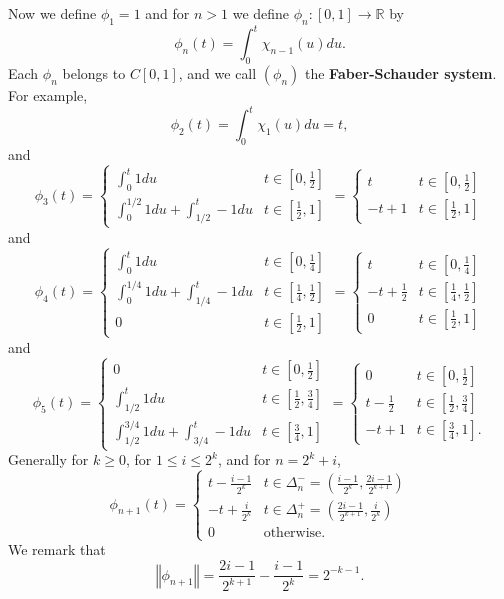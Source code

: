 \documentclass{article}
\newcommand{\norm}[1]{\left\Vert #1 \right\Vert}
\theoremstyle{definition}
\theoremstyle{definition}
\begin{document}
Now we define $\phi_1=1$ and for $n>1$ we define $\phi_n:[0,1] \to \mathbb{R}$ by
\[
\phi_n(t) = \int_0^t \chi_{n-1}(u) du.
\]
Each $\phi_n$ belongs to $C[0,1]$, and we call $(\phi_n)$ the \textbf{Faber-Schauder system}. 
For example,
\[
\phi_2(t) = \int_0^t \chi_1(u) du = t,
\]
 and
\[
 \phi_3(t) = \begin{cases}
\int_0^t 1du&t \in \left[0,\frac{1}{2}\right]\\
 \int_0^{1/2} 1du + \int_{1/2}^t -1 du&t \in \left[\frac{1}{2},1\right]
 \end{cases}
 =\begin{cases}
t &t \in \left[0,\frac{1}{2}\right]\\
-t+1 &t \in \left[\frac{1}{2},1\right]
 \end{cases}
\]
and
\[
 \phi_4(t) = \begin{cases}
\int_0^t 1du&t \in \left[0,\frac{1}{4}\right]\\
 \int_0^{1/4} 1du + \int_{1/4}^t -1 du&t \in \left[\frac{1}{4},\frac{1}{2} \right]\\
 0&t \in \left[\frac{1}{2},1\right]
 \end{cases}
 =\begin{cases}
t &t \in \left[0,\frac{1}{4}\right]\\
-t+\frac{1}{2} &t \in \left[\frac{1}{4},\frac{1}{2} \right]\\
 0&t \in \left[\frac{1}{2},1\right]
 \end{cases}
\]
and
\[
 \phi_5(t) = \begin{cases}
 0&t \in \left[0,\frac{1}{2}\right]\\
\int_{1/2}^t 1du&t \in \left[\frac{1}{2},\frac{3}{4}\right]\\
 \int_{1/2}^{3/4} 1du + \int_{3/4}^t -1 du&t \in \left[\frac{3}{4},1 \right]
  \end{cases}
 =\begin{cases}
  0&t \in \left[0,\frac{1}{2}\right]\\
t -\frac{1}{2}&t \in\left[\frac{1}{2},\frac{3}{4}\right]\\
-t+1 &t \in \left[\frac{3}{4},1 \right].
 \end{cases}
\]
Generally  for $k \geq 0$, for $1 \leq i \leq 2^k$, and for $n=2^k+i$,
\[
\phi_{n+1}(t) = \begin{cases}
t-\frac{i-1}{2^k}&t \in \Delta_{n}^-=\left(\frac{i-1}{2^k}, \frac{2i-1}{2^{k+1}}\right)\\
-t+ \frac{i}{2^{k}}&t \in \Delta_{n}^+=\left(\frac{2i-1}{2^{k+1}}, \frac{i}{2^{k}}\right)\\
0&\textrm{otherwise}.
\end{cases}
\]
We remark that 
\[
\norm{\phi_{n+1}} = \frac{2i-1}{2^{k+1}}-\frac{i-1}{2^k} = 2^{-k-1}.
\]
\end{document}
